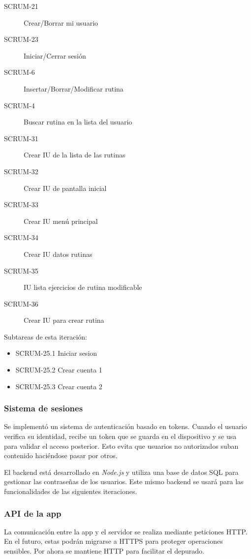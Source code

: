 \begin{description}
  \item[SCRUM-21] Crear/Borrar mi usuario
  \item[SCRUM-23] Iniciar/Cerrar sesión
  \item[SCRUM-6] Insertar/Borrar/Modificar rutina
  \item[SCRUM-4] Buscar rutina en la lista del usuario
  \item[SCRUM-31] Crear IU de la lista de las rutinas
  \item[SCRUM-32] Crear IU de pantalla inicial
  \item[SCRUM-33] Crear IU menú principal
  \item[SCRUM-34] Crear IU datos rutinas
  \item[SCRUM-35] IU lista ejercicios de rutina modificable
  \item[SCRUM-36] Crear IU para crear rutina
\end{description}

Subtareas de esta iteración:

\begin{itemize}
	\item SCRUM-25.1 Iniciar sesion
	\item SCRUM-25.2 Crear cuenta 1
	\item SCRUM-25.3 Crear cuenta 2
\end{itemize}

\subsubsection*{Sistema de sesiones}
Se implement\'o un sistema de autenticaci\'on basado en tokens. Cuando el usuario verifica su identidad, recibe un token que se guarda en el dispositivo y se usa para validar el acceso posterior. Esto evita que usuarios no autorizados suban contenido haci\'endose pasar por otros.

El backend est\'a desarrollado en \textit{Node.js} y utiliza una base de datos SQL para gestionar las contrase\~nas de los usuarios. Este mismo backend se usar\'a para las funcionalidades de las siguientes iteraciones.

\subsubsection*{API de la app}
La comunicaci\'on entre la app y el servidor se realiza mediante peticiones HTTP. En el futuro, estas podr\'an migrarse a HTTPS para proteger operaciones sensibles. Por ahora se mantiene HTTP para facilitar el depurado.

